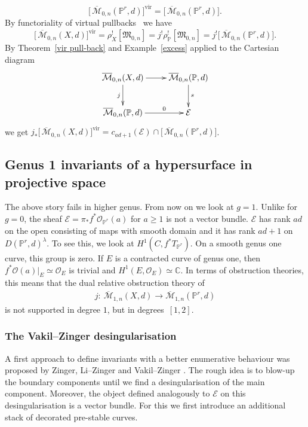 \documentclass[pdftex]{sigma}
\numberwithin{equation}{section}
\newcommand{\vv}{\mathrm{vir}}
\newcommand{\PP}{\mathbb P}
\newcommand{\MM}[4]{\overline{\mathcal M}_{#1,#2}(#3,#4)}
\begin{document}
\[\big[\,\MM{0}{n}{\mathbb P^r}{d}\big]^{\vv}=\big[\,\MM{0}{n}{\mathbb P^r}{d}\big].
\]
By functoriality of virtual pullbacks~\cite{vir-pull} we have
\[
 \big[\,\MM{0}{n}{X}{d}\big]^\text{vir}=\rho_X^![\mathfrak M_{0,n}]=j^!\rho_{\mathbb P}^![\mathfrak M_{0,n}]=j^!\big[\,\MM{0}{n}{\mathbb P^r}{d}\big].
\]
By Theorem~\ref{vir pull-back} and Example~\ref{excess} applied to the Cartesian diagram
\[\xymatrix{\MM{0}{n}{X}{d}\ar[r]\ar[d]_j&\MM{0}{n}{\PP}{d}\ar[d]^s\\
\MM{0}{n}{\PP}{d}\ar[r]^-0 &\mathcal{E}
}
\]
we get $j_*\big[\,\MM{0}{n}{X}{d}\big]^{\vv}=c_{ad+1}(\mathcal{E})\cap\big[\,\MM{0}{n}{\mathbb P^r}{d}\big]$.

\subsection{Genus 1 invariants of a hypersurface in projective space}
The above story fails in higher genus. From now on we look at $g=1$. Unlike for $g=0$, the sheaf $\mathcal{E}=\pi_*f^*\mathcal O_{\mathbb P^r}(a)$ for $a\geq 1$ is not a vector bundle. $\mathcal{E}$ has rank $ad$ on the open consisting of maps with smooth domain and it has rank $ad+1$ on $D(\PP^r,d)^\lambda$. To see this, we look at $H^1(C,f^*T_{\mathbb P^r})$. On a smooth genus one curve, this group is zero. If $E$ is a contracted curve of genus one, then $f^*\mathcal O(a)|_E\simeq \mathcal O_E$ is trivial and $H^1(E,\mathcal O_E)\simeq \mathbb C$. In terms of obstruction theories, this means that the dual relative obstruction theory of \begin{gather*}j\colon \ \MM{1}{n}{X}{d}\to \MM{1}{n}{\mathbb P^r}{d}\end{gather*} is not supported in degree $1$, but in degrees~$[1,2]$.

\subsubsection{The Vakil--Zinger desingularisation}\label{vzdesing} A first approach to define invariants with a better enumerative behaviour was proposed by Zinger, Li--Zinger and Vakil--Zinger \cite{LZ,VZ,zingerstvsred,redgone,zingred}. The rough idea is to blow-up the boundary components until we find a desingularisation of the main component. Moreover, the object defined analogously to $\mathcal{E}$ on this desingularisation is a vector bundle. For this we first introduce an additional stack of decorated pre-stable curves.
\end{document}
